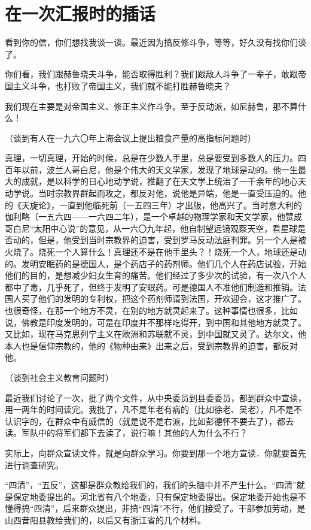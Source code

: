 \section[在一次汇报时的插话（一九六四年三月）]{在一次汇报时的插话}

看到你的信，你们想找我谈一谈。最近因为搞反修斗争，等等，好久没有找你们谈了。

你们看，我们跟赫鲁晓夫斗争，能否取得胜利？我们跟敌人斗争了一辈子，敢跟帝国主义斗争，也打败了帝国主义，我们就不能打胜赫鲁晓夫？

我们现在主要是对帝国主义、修正主义作斗争。至于反动派，如尼赫鲁，那不算什么！

（谈到有人在一九六〇年上海会议上提出粮食产量的高指标问题时）

真理，一切真理，开始的时候，总是在少数人手里，总是要受到多数人的压力。四百年以前，波兰人哥白尼，他是个伟大的天文学家，发现了地球是动的。他一生最大的成就，是以科学的日心地动学说，推翻了在天文学上统治了一千余年的地心天动学说。当时宗教界群起而攻之，都反对他，说他是异端，他是一直受压迫的。他的《天旋论》，一直到他临死前（一五四三年）才出版，他高兴了。当时意大利的伽利略（一五六四——一六四二年），是一个卓越的物理学家和天文学家，他赞成哥白尼“太阳中心说”的意见，从一六〇九年起，他自制望远镜观察天空，看星球是否动的，但是，他受到当时宗教界的迫害，受到罗马反动法庭判罪。另一个人是被火烧了。烧死一个人算什么！真理还不是在他手里头？！烧死一个人，地球还是动的。发明安眠药的是德国人，是个药店子的药剂师。他们几个人在药店试验，开始他们的目的，是想减少妇女生育的痛苦。他们经过了多少次的试验，有一次八个人都中了毒，几乎死了，但终于发明了安眠药。可是德国人不准他们制造和推销。法国人买了他们的发明的专利权，把这个药剂师请到法国，开欢迎会，这才推广了。也很奇怪，在那一个地方不灵，在别的地方就灵起来了。这种事情也很多，比如说，佛教是印度发明的，可是在印度并不那样吃得开，到中国和其他地方就灵了。又比如，现在马克思列宁主义在欧洲和苏联就不灵，到中国就又灵了。达尔文，他本人也是信仰宗教的，他的《物种由来》出来之后，受到宗教界的迫害，都反对他。

（谈到社会主义教育问题时）

最近我们讨论了一次，批了两个文件，从中央委员到县委委员，都到群众中宣读，用一两年的时间读完。我批了，凡不是年老有病的（比如徐老、吴老），凡不是不认识字的，在群众中有威信的（就是说不是右派，比如彭德怀不要去了），都去读。军队中的将军们都下去读了，说行嘛！其他的人为什么不行？

实际上，向群众宣读文件，就是向群众学习。你要到那一个地方宣读．你就要首先进行调查研究。

“四清”，“五反”，这都是群众教给我们的，我们的头脑中并不产生什么。“四清”就是保定地委提出的。河北省有八个地委，只有保定地委提出。保定地委开始也是不懂得搞“四清”，后来群众提出，非搞“四清”不行，他们接受了。干部参加劳动，是山西昔阳县教给我们的，以后又有浙江省的几个材料。

